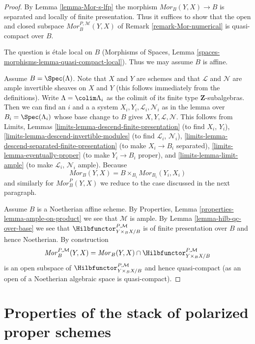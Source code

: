 \begin{proof}
By Lemma \ref{lemma-Mor-s-lfp} the morphism $\mathit{Mor}_B(Y, X) \to B$
is separated and locally of finite presentation. Thus it suffices to
show that the open and closed subspace $\mathit{Mor}^{P, \mathcal{M}}_B(Y, X)$
of Remark \ref{remark-Mor-numerical} is quasi-compact over $B$.

\medskip\noindent
The question is \'etale local on $B$
(Morphisms of Spaces, Lemma \ref{spaces-morphisms-lemma-quasi-compact-local}).
Thus we may assume $B$ is affine.

\medskip\noindent
Assume $B = \Spec(\Lambda)$. Note that $X$ and
$Y$ are schemes and that $\mathcal{L}$ and $\mathcal{N}$ are ample
invertible sheaves on $X$ and $Y$ (this follows immediately from the
definitions). Write $\Lambda = \colim \Lambda_i$ as the
colimit of its finite type $\mathbf{Z}$-subalgebras. Then
we can find an $i$ and a a system $X_i, Y_i, \mathcal{L}_i, \mathcal{N}_i$
as in the lemma over $B_i = \Spec(\Lambda_i)$ whose base change to
$B$ gives $X, Y, \mathcal{L}, \mathcal{N}$. This follows from
Limits, Lemmas
\ref{limits-lemma-descend-finite-presentation} (to find $X_i$, $Y_i$),
\ref{limits-lemma-descend-invertible-modules} (to find $\mathcal{L}_i$,
$\mathcal{N}_i$), \ref{limits-lemma-descend-separated-finite-presentation}
(to make $X_i \to B_i$ separated), \ref{limits-lemma-eventually-proper}
(to make $Y_i \to B_i$ proper), and \ref{limits-lemma-limit-ample}
(to make $\mathcal{L}_i$, $\mathcal{N}_i$ ample).
Because
$$
\mathit{Mor}_B(Y, X) = B \times_{B_i} \mathit{Mor}_{B_i}(Y_i, X_i)
$$
and similarly for $\mathit{Mor}^P_B(Y, X)$ we reduce
to the case discussed in the next paragraph.

\medskip\noindent
Assume $B$ is a Noetherian affine scheme. By
Properties, Lemma \ref{properties-lemma-ample-on-product}
we see that $\mathcal{M}$ is ample. By Lemma \ref{lemma-hilb-qc-over-base}
we see that $\Hilbfunctor^{P, \mathcal{M}}_{Y \times_B X/B}$ is of
finite presentation over $B$ and hence Noetherian.
By construction
$$
\mathit{Mor}^{P, \mathcal{M}}_B(Y, X) =
\mathit{Mor}_B(Y, X) \cap
\Hilbfunctor^{P, \mathcal{M}}_{Y \times_B X/B}
$$
is an open subspace of $\Hilbfunctor^{P, \mathcal{M}}_{Y \times_B X/B}$ and
hence quasi-compact (as an open of a Noetherian algebraic space
is quasi-compact).
\end{proof}






\section{Properties of the stack of polarized proper schemes}
\label{section-polarized}

